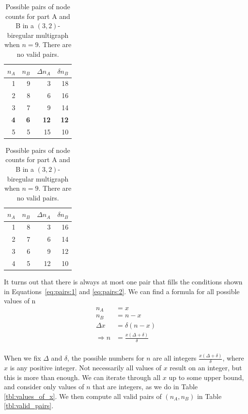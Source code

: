 \begin{table}[H]
  \parbox{.45\linewidth}{
    \centering
    \begin{tabular}{rrrr}
    \toprule
    $n_A$&$n_B$&$\Delta n_A$&$\delta n_B$\\
    \midrule
    1 & 9 & 3  & 18\\
    2 & 8 & 6  & 16\\
    3 & 7 & 9  & 14\\
    \textbf{4} & \textbf{6} & \textbf{12} & \textbf{12}\\
    5 & 5 & 15 & 10\\
    \bottomrule
  \end{tabular}
  \caption{
    Possible pairs of node counts for part A and B in a $(3,2)$-biregular multigraph when $n=10$.
    The only valid pair with $\Delta n_A = \delta n_B$ is (4, 6), and it is bolded.
  }
  \label{tbl:possible_pairs}
  }
  \hfill
  \parbox{.45\linewidth}{
  \centering
  \begin{tabular}{rrrr}
    \toprule
    $n_A$&$n_B$&$\Delta n_A$&$\delta n_B$\\
    \midrule
    1 & 8 & 3  & 16\\
    2 & 7 & 6  & 14\\
    3 & 6 & 9  & 12\\
    4 & 5 & 12 & 10\\
    \bottomrule
  \end{tabular}
  \caption{
    Possible pairs of node counts for part A and B in a $(3,2)$-biregular multigraph when $n=9$.
    There are no valid pairs.
  }
  \label{tbl:possible_pairs:no_pairs}
  }
\end{table}

It turns out that there is always at most one pair that fills the conditions shown in Equations~\ref{eq:pairs:1} and \ref{eq:pairs:2}.
We can find a formula for all possible values of n
\begin{align}
  n_A &= x \\
  n_B &= n-x\\
  \Delta x &= \delta (n-x) \\
  \Rightarrow n&=\frac{x(\Delta+\delta)}{\delta}\\
\end{align}

When we fix $\Delta$ and $\delta$, the possible numbers for $n$ are all integers $\frac{x(\Delta + \delta)}{\delta}$, where $x$ is any positive integer.
Not necessarily all values of $x$ result on an integer, but this is more than enough.
We can iterate through all $x$ up to some upper bound, and consider only values of $n$ that are integers, as we do in Table \ref{tbl:values_of_x}.
We then compute all valid pairs of $(n_A, n_B)$ in Table \ref{tbl:valid_pairs}.

